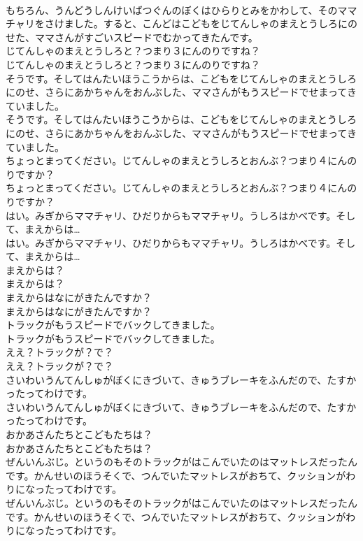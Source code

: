 \documentclass[8pt]{extreport}
\begin{document}
\begin{CJK}{UTF8}{min}
\\	もちろん、うんどうしんけいばつぐんのぼくはひらりとみをかわして、そのママチャリをさけました。すると、こんどはこどもをじてんしゃのまえとうしろにのせた、ママさんがすごいスピードでむかってきたんです。
\\	じてんしゃのまえとうしろと？つまり３にんのりですね？
\\	じてんしゃのまえとうしろと？つまり３にんのりですね？
\\	そうです。そしてはんたいほうこうからは、こどもをじてんしゃのまえとうしろにのせ、さらにあかちゃんをおんぶした、ママさんがもうスピードでせまってきていました。
\\	そうです。そしてはんたいほうこうからは、こどもをじてんしゃのまえとうしろにのせ、さらにあかちゃんをおんぶした、ママさんがもうスピードでせまってきていました。
\\	ちょっとまってください。じてんしゃのまえとうしろとおんぶ？つまり４にんのりですか？
\\	ちょっとまってください。じてんしゃのまえとうしろとおんぶ？つまり４にんのりですか？
\\	はい。みぎからママチャリ、ひだりからもママチャリ。うしろはかべです。そして、まえからは…
\\	はい。みぎからママチャリ、ひだりからもママチャリ。うしろはかべです。そして、まえからは…
\\	まえからは？
\\	まえからは？
\\	まえからはなにがきたんですか？
\\	まえからはなにがきたんですか？
\\	トラックがもうスピードでバックしてきました。
\\	トラックがもうスピードでバックしてきました。
\\	ええ？トラックが？で？
\\	ええ？トラックが？で？
\\	さいわいうんてんしゅがぼくにきづいて、きゅうブレーキをふんだので、たすかったってわけです。
\\	さいわいうんてんしゅがぼくにきづいて、きゅうブレーキをふんだので、たすかったってわけです。
\\	おかあさんたちとこどもたちは？
\\	おかあさんたちとこどもたちは？
\\	ぜんいんぶじ。というのもそのトラックがはこんでいたのはマットレスだったんです。かんせいのほうそくで、つんでいたマットレスがおちて、クッションがわりになったってわけです。
\\	ぜんいんぶじ。というのもそのトラックがはこんでいたのはマットレスだったんです。かんせいのほうそくで、つんでいたマットレスがおちて、クッションがわりになったってわけです。

\end{CJK}
\end{document}
